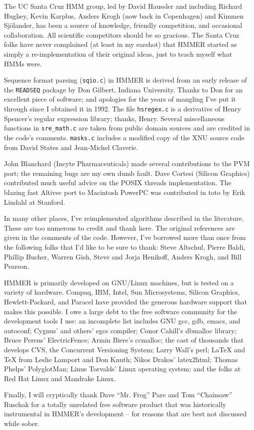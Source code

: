 The UC Santa Cruz HMM group, led by David Haussler and including
Richard Hughey, Kevin Karplus, Anders Krogh (now back in Copenhagen)
and Kimmen Sj\"{o}lander, has been a source of knowledge, friendly
competition, and occasional collaboration. All scientific competitors
should be so gracious. The Santa Cruz folks have never complained (at
least in my earshot) that HMMER started as simply a re-implementation
of their original ideas, just to teach myself what HMMs were.

Sequence format parsing ({\tt sqio.c}) in HMMER is derived from an
early release of the {\tt READSEQ} package by Don Gilbert, Indiana
University. Thanks to Don for an excellent piece of software; and
apologies for the years of mangling I've put it through since I
obtained it in 1992. The file {\tt hsregex.c} is a derivative of Henry
Spencer's regular expression library; thanks, Henry. Several
miscellaneous functions in {\tt sre\_math.c} are taken from public
domain sources and are credited in the code's comments. {\tt masks.c}
includes a modified copy of the XNU source code from David States and
Jean-Michel Claverie.

John Blanchard (Incyte Pharmaceuticals) made several contributions to
the PVM port; the remaining bugs are my own dumb fault.  Dave Cortesi
(Silicon Graphics) contributed much useful advice on the POSIX threads
implementation. The blazing fast Altivec port to Macintosh PowerPC was
contributed in toto by Erik Lindahl at Stanford.

In many other places, I've reimplemented algorithms described in the
literature. These are too numerous to credit and thank here. The
original references are given in the comments of the code. However,
I've borrowed more than once from the following folks that I'd like to
be sure to thank: Steve Altschul, Pierre Baldi, Phillip Bucher, Warren
Gish, Steve and Jorja Henikoff, Anders Krogh, and Bill Pearson.

HMMER is primarily developed on GNU/Linux machines, but is tested on a
variety of hardware. Compaq, IBM, Intel, Sun Microsystems, Silicon
Graphics, Hewlett-Packard, and Paracel have provided the generous
hardware support that makes this possible. I owe a large debt to the
free software community for the development tools I use: an incomplete
list includes GNU gcc, gdb, emacs, and autoconf; Cygnus' and others'
egcs compiler; Conor Cahill's dbmalloc library; Bruce Perens'
ElectricFence; Armin Biere's ccmalloc; the cast of thousands that
develops CVS, the Concurrent Versioning System; Larry Wall's perl;
LaTeX and TeX from Leslie Lamport and Don Knuth; Nikos Drakos'
latex2html; Thomas Phelps' PolyglotMan; Linus Torvalds' Linux
operating system; and the folks at Red Hat Linux and Mandrake Linux.

Finally, I will cryptically thank Dave ``Mr. Frog'' Pare and Tom
``Chainsaw'' Ruschak for a totally unrelated free software product
that was historically instrumental in HMMER's development -- for
reasons that are best not discussed while sober.

\label{manualend}